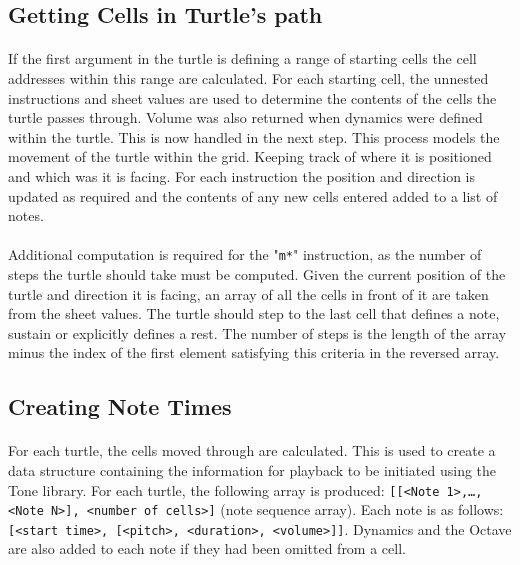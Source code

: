 \subsection{Getting Cells in Turtle's path}

\paragraph{} If the first argument in the turtle is defining a range of starting cells the cell addresses within this range are calculated. For each starting cell, the unnested instructions and sheet values are used to determine the contents of the cells the turtle passes through. Volume was also returned when dynamics were defined within the turtle. This is now handled in the next step. This process models the movement of the turtle within the grid. Keeping track of where it is positioned and which was it is facing. For each instruction the position and direction is updated as required and the contents of any new cells entered added to a list of notes.

\paragraph{} Additional computation is required for the "\texttt{m*}" instruction, as the number of steps the turtle should take must be computed. Given the current position of the turtle and direction it is facing, an array of all the cells in front of it are taken from the sheet values. The turtle should step to the last cell that defines a note, sustain or explicitly defines a rest. The number of steps is the length of the array minus the index of the first element satisfying this criteria in the reversed array.

\subsection{Creating Note Times}

\paragraph{} For each turtle, the cells moved through are calculated. This is used to create a data structure containing the information for playback to be initiated using the Tone library. For each turtle, the following array is produced: \texttt{[[<Note 1>,…,<Note N>], <number of cells>]} (note sequence array). Each note is as follows: \texttt{[<start time>, [<pitch>, <duration>, <volume>]]}. Dynamics and the Octave are also added to each note if they had been omitted from a cell.

